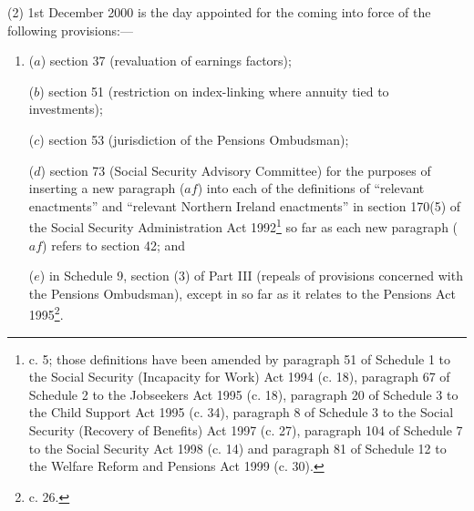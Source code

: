 \documentclass[12pt,a4paper]{article}
\begin{document}
(2) 1st December 2000 is the day appointed for the coming into force of the following provisions:—
\begin{enumerate}\item[]
($a$) section 37 (revaluation of earnings factors);

($b$) section 51 (restriction on index-linking where annuity tied to investments);

($c$) section 53 (jurisdiction of the Pensions Ombudsman);

($d$) section 73 (Social Security Advisory Committee) for the purposes of inserting a new paragraph ($af$)  into each of the definitions of “relevant enactments” and “relevant Northern Ireland enactments” in section 170(5) of the Social Security Administration Act 1992\footnote{ c. 5; those definitions have been amended by paragraph 51 of Schedule 1 to the Social Security (Incapacity for Work) Act 1994 (c. 18), paragraph 67 of Schedule 2 to the Jobseekers Act 1995 (c. 18), paragraph 20 of Schedule 3 to the Child Support Act 1995 (c. 34), paragraph 8 of Schedule 3 to the Social Security (Recovery of Benefits) Act 1997 (c. 27), paragraph 104 of Schedule 7 to the Social Security Act 1998 (c. 14) and paragraph 81 of Schedule 12 to the Welfare Reform and Pensions Act 1999 (c. 30).} so far as each new paragraph ($af$)  refers to section 42; and

($e$) in Schedule 9, section (3) of Part III (repeals of provisions concerned with the Pensions Ombudsman), except in so far as it relates to the Pensions Act 1995\footnote{ c. 26.}.
\end{enumerate}
\end{document}

